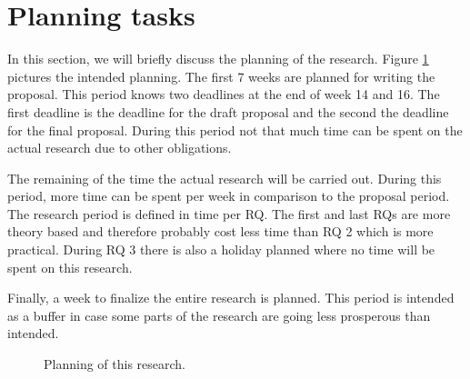 \section{Planning tasks}\label{sec:planning}
In this section, we will briefly discuss the planning of the research. Figure \ref{fig:planning} pictures the intended planning. The first 7 weeks are planned for writing the proposal. This period knows two deadlines at the end of week 14 and 16. The first deadline is the deadline for the draft proposal and the second the deadline for the final proposal. During this period not that much time can be spent on the actual research due to other obligations. 

The remaining of the time the actual research will be carried out. During this period, more time can be spent per week in comparison to the proposal period. The research period is defined in time per RQ. The first and last RQs are more theory based and therefore probably cost less time than RQ 2 which is more practical. During RQ 3 there is also a holiday planned where no time will be spent on this research. 

Finally, a week to finalize the entire research is planned. This period is intended as a buffer in case some parts of the research are going less prosperous than intended. 


\begin{figure}[h!]
\centering
%
\noindent{}
\caption{Planning of this research.}
\label{fig:planning}
\end{figure}

